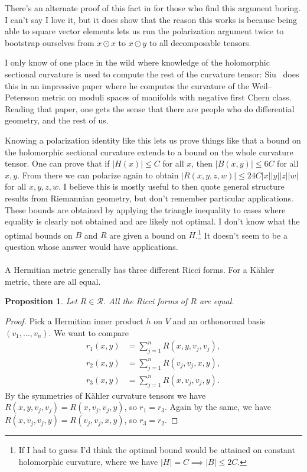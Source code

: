 \documentclass[11pt]{article}
\newtheorem{prop}[theo]{Proposition}
\newtheorem*{proof}{Proof}
\newcommand{\cc}[1]{\mathcal{#1}}
\begin{document}
There's an alternate proof of this fact in \cite[Lemma~7.19]{zheng2000complex} for those who find this argument boring. I can't say I love it, but it does show that the reason this works is because being able to square vector elements lets us run the polarization argument twice to bootstrap ourselves from $x \odot x$ to $x \odot y$ to all decomposable tensors.

I only know of one place in the wild where knowledge of the holomorphic sectional curvature is used to compute the rest of the curvature tensor: Siu~\cite{siu1986curvature} does this in an impressive paper where he computes the curvature of the Weil--Petersson metric on moduli spaces of manifolds with negative first Chern class. Reading that paper, one gets the sense that there are people who do differential geometry, and the rest of us.

Knowing a polarization identity like this lets us prove things like that a bound on the holomorphic sectional curvature extends to a bound on the whole curvature tensor. One can prove that if $|H(x)| \leq C$ for all $x$, then $|B(x,y)| \leq 6 C$ for all $x,y$. From there we can polarize again to obtain $|R(x,y,z,w)| \leq 24C |x||y||z||w|$ for all $x,y,z,w$. I believe this is mostly useful to then quote general structure results from Riemannian geometry, but don't remember particular applications. These bounds are obtained by applying the triangle inequality to cases where equality is clearly not obtained and are likely not optimal. I don't know what the optimal bounds on $B$ and $R$ are given a bound on $H$.\footnote{If I had to guess I'd think the optimal bound would be attained on constant holomorphic curvature, where we have $|H| = C \implies |B| \leq 2C$.} It doesn't seem to be a question whose answer would have applications.

\paragraph{}
A Hermitian metric generally has three different Ricci forms. For a K\"ahler metric, these are all equal.

\begin{prop}
Let $R \in \cc R$. All the Ricci forms of $R$ are equal.
\end{prop}

\begin{proof}
  Pick a Hermitian inner product $h$ on $V$ and an orthonormal basis $(v_1,\ldots,v_n)$. We want to compare
\begin{align*}
r_1(x,y) &= \sum_{j=1}^n R(x,y,v_j,v_j),
\\
r_2(x,y) &= \sum_{j=1}^n R(v_j, v_j, x,y),
\\
r_3(x,y) &= \sum_{j=1}^n R(x,v_j,v_j,y).
\end{align*}
By the symmetries of K\"ahler curvature tensors we have $R(x,y,v_j,v_j) = R(x,v_j,v_j,y)$, so $r_1 = r_3$. Again by the same, we have $R(x,v_j,v_j,y) = R(v_j,v_j,x,y)$, so $r_3 = r_2$.
\end{proof}
\end{document}
